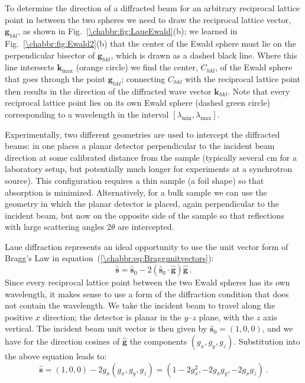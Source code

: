 To determine the direction of a diffracted beam for an arbitrary reciprocal lattice point in between the two spheres we need to draw the reciprocal lattice vector, $\mathbf{g}_{hkl}$, as shown in Fig.~\ref{\chabbr:fig:LaueEwald}(b); we learned in Fig.~\ref{\chabbr:fig:Ewald2}(b) that the center of the Ewald sphere must lie on the perpendicular bisector of $\mathbf{g}_{hkl}$, which is drawn as a dashed black line.  Where this line intersects $\mathbf{k}_{\text{max}}$ (orange circle) we find the center, $C_{hkl}$, of the Ewald sphere that goes through the point $\mathbf{g}_{hkl}$; connecting $C_{hkl}$ with the reciprocal lattice point then results in the direction of the diffracted wave vector $\mathbf{k}_{hkl}$.  Note that every reciprocal lattice point lies on its own Ewald sphere (dashed green circle) corresponding to a wavelength in the interval $[\lambda_{\text{min}},\lambda_{\text{max}}]$. 

Experimentally, two different geometries are used to intercept the diffracted beams: in  one places a planar detector perpendicular to the incident beam direction at some calibrated distance from the sample (typically several cm for a laboratory setup, but potentially much longer for experiments at a synchrotron source). This configuration requires a thin sample (a foil shape) so that absorption is minimized.  Alternatively, for a bulk sample we can use the  geometry in which the planar detector is placed, again perpendicular to the incident beam, but now on the opposite side of the sample so that reflections with large scattering angles $2\theta$ are intercepted. 

Laue diffraction represents an ideal opportunity to use the unit vector form of Bragg's Law in equation~(\ref{\chabbr:eq:Braggunitvectors}):
\[
	\hat{\mathbf{s}} = \hat{\mathbf{s}}_0-2(\hat{\mathbf{s}}_0\cdot\hat{\mathbf{g}})\hat{\mathbf{g}}\ .
\]
Since every reciprocal lattice point between the two Ewald spheres has its own wavelength, it makes sense to use a form of the diffraction condition that does not contain the wavelength.  We take the incident beam to travel along the positive $x$ direction; the detector is planar in the $y$--$z$ plane, with the $z$ axis vertical. The incident beam unit vector is then given by $\hat{\mathbf{s}}_0=(1,0,0)$, and we have for the direction cosines of $\hat{\mathbf{g}}$ the components $(g_x,g_y,g_z)$.  Substitution into the above equation leads to:
\[
	\hat{\mathbf{s}} = (1,0,0)-2g_x(g_x,g_y,g_z) = (1-2g_x^2,-2g_xg_y,-2g_xg_z)\ .
\]

